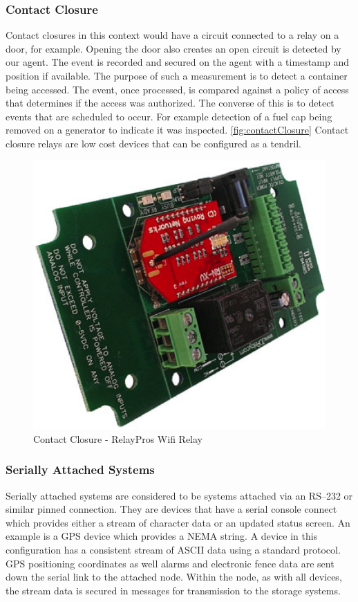 \subsubsection{Contact Closure}
Contact closures\cite{OmegaEngineeringInc:vi} in this context would have a circuit connected to a relay on a door, for example. Opening the door also creates an open circuit is detected by our agent. The event is recorded and secured on the agent with a timestamp and position if available. The purpose of such a measurement is to detect a container being accessed. The event, once processed, is compared against a policy of access that determines if the access was authorized. The converse of this is to detect events that are scheduled to occur. For example detection of a fuel cap being removed on a generator to indicate it was inspected. \autoref{fig:contactClosure} Contact closure relays are low cost devices that can be configured as a tendril\cite{Anonymous:wa}.
\begin{figure}
\centering
\includegraphics{Figures/contactClosure}
\caption{Contact Closure - RelayPros Wifi Relay}
\label{fig:contactClosure}
\end{figure}

\subsubsection{Serially Attached Systems} 
Serially attached systems are considered to be systems attached via an RS–232 or similar pinned connection. They are devices that have a serial console connect which provides either a stream of character data or an updated status screen. An example is a GPS device which provides a NEMA string. A device in this configuration has a consistent stream of ASCII data using a standard protocol. GPS positioning coordinates as well alarms and electronic fence data are sent down the serial link to the attached node. Within the node, as with all devices, the stream data is secured in messages for transmission to the storage systems.

